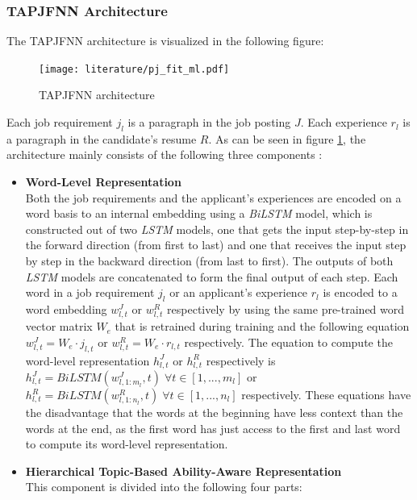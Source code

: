 \documentclass[draft,final]{thesisclass} %
\begin{document}
\subsubsection{\acs{TAPJFNN} Architecture}
The \acs{TAPJFNN} architecture is visualized in the following figure:
\begin{figure}[H]
    \centering
    \texttt{[image: literature/pj\_fit\_ml.pdf]}
    \caption{\acs{TAPJFNN} architecture \parencite[8]{pj_fit_ml}}
    \label{fig:tapjfnn_architecture}
\end{figure}
Each job requirement $j_l$ is a paragraph in the job posting $J$.
Each experience $r_l$ is a paragraph in the candidate's resume $R$.
As can be seen in figure \ref{fig:tapjfnn_architecture}, the architecture mainly consists of the following three components \parencite[8-14]{pj_fit_ml}:
\begin{itemize}
    \item \textbf{Word-Level Representation}\\
        Both the job requirements and the applicant's experiences are encoded on a word basis to an internal embedding using a \textit{BiLSTM} model, which is constructed out of two \textit{LSTM} models, one that gets the input step-by-step in the forward direction (from first to last) and one that receives the input step by step in the backward direction (from last to first).
        The outputs of both \textit{LSTM} models are concatenated to form the final output of each step.
        Each word in a job requirement $j_l$ or an applicant's experience $r_l$ is encoded to a word embedding $w^J_{l,t}$ or $w^R_{l,t}$ respectively by using the same pre-trained word vector matrix $W_e$ that is retrained during training and the following equation $w^J_{l,t} = W_e \cdot j_{l,t}$ or $w^R_{l,t} = W_e \cdot r_{l,t}$ respectively.
        The equation to compute the word-level representation $h^J_{l,t}$ or $h^R_{l,t}$ respectively is $h^J_{l,t} = BiLSTM(w^J_{l,1:m_l},t) \; \forall t \in [1,...,m_l]$ or $h^R_{l,t} = BiLSTM(w^R_{l,1:n_l},t) \; \forall t \in [1,...,n_l]$ respectively.
        These equations have the disadvantage that the words at the beginning have less context than the words at the end, as the first word has just access to the first and last word to compute its word-level representation.
    \item \textbf{Hierarchical Topic-Based Ability-Aware Representation}\\
    This component is divided into the following four parts:
    \begin{itemize}

\end{itemize}
\end{itemize}
\end{document}
